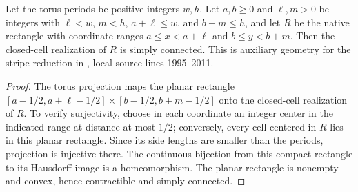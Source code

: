 \begin{lemma}%
    \label{thm:peps_torus_rectangle_realization}
    \leanok
    Let the torus periods be positive integers $w,h$. Let $a,b\geq0$ and
    $\ell,m>0$ be integers with $\ell<w$, $m<h$, $a+\ell\leq w$, and
    $b+m\leq h$, and let $R$ be the native rectangle with coordinate ranges
    $a\leq x<a+\ell$ and $b\leq y<b+m$.
    Then the closed-cell realization of $R$ is simply connected.
    This is auxiliary geometry for the stripe reduction in
    \cite[Theorem~6.7]{Schuch2010PEPS}, local source lines 1995--2011.
\end{lemma}

\begin{proof}\leanok
    The torus projection maps the planar rectangle
    $[a-1/2,a+\ell-1/2]\times[b-1/2,b+m-1/2]$ onto the closed-cell
    realization of $R$. To verify surjectivity, choose in each coordinate
    an integer center in the indicated range at distance at most $1/2$;
    conversely, every cell centered in $R$ lies in this planar rectangle.
    Since its side lengths are smaller than the periods, projection is
    injective there. The continuous bijection from this compact rectangle
    to its Hausdorff image is a homeomorphism. The planar rectangle is
    nonempty and convex, hence contractible and simply connected.
\end{proof}
